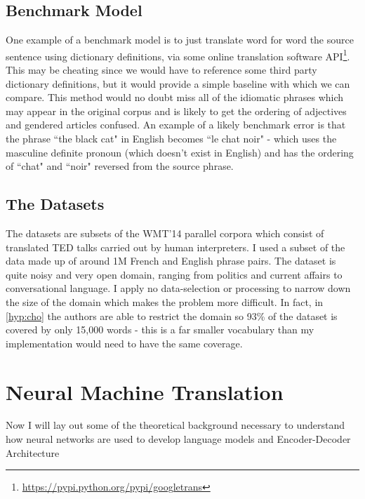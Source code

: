 \documentclass[]{article}
\begin{document}
\subsection{Benchmark Model}
One example of a benchmark model is to just translate word for word the source sentence using dictionary definitions, via some online translation software API\footnote{\url{https://pypi.python.org/pypi/googletrans}}. This may be cheating since we would have to reference some third party dictionary definitions, but it would provide a simple baseline with which we can compare. This method would no doubt miss all of the idiomatic phrases which may appear in the original corpus and is likely to get the ordering of adjectives and gendered articles confused. An example of a likely benchmark error is that the phrase ``the black cat" in English becomes ``le chat noir" - which uses the masculine definite pronoun (which doesn't exist in English) and has the ordering of ``chat" and ``noir" reversed from the source phrase.
\subsection{The Datasets}
The datasets are subsets of the WMT'14 parallel corpora which consist of translated TED talks carried out by human interpreters. I used a subset of the data made up of around 1M French and English phrase pairs. The dataset is quite noisy and very open domain, ranging from politics and current affairs to conversational language. I apply no data-selection or processing to narrow down the size of the domain which makes the problem more difficult. In fact, in \ref{hyp:cho} the authors are able to restrict the domain so 93\% of the dataset is covered by only 15,000 words - this is a far smaller vocabulary than my implementation would need to have the same coverage.
\section{Neural Machine Translation}
Now I will lay out some of the theoretical background necessary to understand how neural networks are used to develop language models and Encoder-Decoder Architecture 
\end{document}
